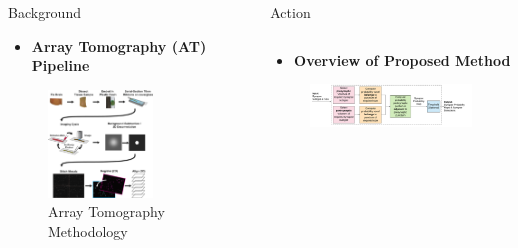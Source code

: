 \documentclass[final, table]{beamer}
\newlength{\sepwid}
\newlength{\onecolwid}
\newlength{\twocolwid}
\begin{document}
\begin{frame}[t]
\begin{columns}[t]
\begin{column}{\onecolwid}
\begin{block}{Background}
\begin{itemize} 
\item \textbf{Array Tomography (AT) Pipeline}
\end{itemize} 

\begin{figure}
\centering
\includegraphics[width=0.75\textwidth]{figs/at_diagram3}
\caption{Array Tomography Methodology  \cite{Weiler}}
\end{figure}


\end{block} 


\end{column}

\begin{column}{\sepwid}\end{column}  %
\begin{column}{\twocolwid}



\begin{block}{Action}

\begin{columns}[t]  %

\begin{column}{\onecolwid}

\begin{itemize} 
\item \textbf{Overview of Proposed Method}
\end{itemize} 


\begin{figure}
\centering
\includegraphics[width=1\textwidth]{figs/pipeline2}
\label{fig:pipeline}
\end{figure}


\end{column}
\end{columns}
\end{block}
\end{column}
\end{columns}
\end{frame}
\end{document}
